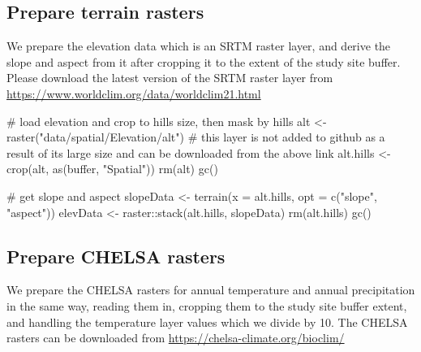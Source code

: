 \documentclass[]{article}
\newenvironment{Shaded}{}{}
\newcommand{\CommentTok}[1]{\textcolor[rgb]{0.00,0.50,0.00}{#1}}
\newcommand{\DataTypeTok}[1]{#1}
\newcommand{\KeywordTok}[1]{\textcolor[rgb]{0.00,0.00,1.00}{#1}}
\newcommand{\NormalTok}[1]{#1}
\newcommand{\OperatorTok}[1]{#1}
\newcommand{\StringTok}[1]{\textcolor[rgb]{0.00,0.50,0.50}{#1}}
\begin{document}
\hypertarget{prepare-terrain-rasters}{%
\subsection{Prepare terrain rasters}\label{prepare-terrain-rasters}}

We prepare the elevation data which is an SRTM raster layer, and derive the slope and aspect from it after cropping it to the extent of the study site buffer. Please download the latest version of the SRTM raster layer from \url{https://www.worldclim.org/data/worldclim21.html}

\begin{Shaded}
\begin{Highlighting}[numbers=left,,]
\CommentTok{# load elevation and crop to hills size, then mask by hills}
\NormalTok{alt <-}\StringTok{ }\KeywordTok{raster}\NormalTok{(}\StringTok{"data/spatial/Elevation/alt"}\NormalTok{) }\CommentTok{# this layer is not added to github as a result of its large size and can be downloaded from the above link}
\NormalTok{alt.hills <-}\StringTok{ }\KeywordTok{crop}\NormalTok{(alt, }\KeywordTok{as}\NormalTok{(buffer, }\StringTok{"Spatial"}\NormalTok{))}
\KeywordTok{rm}\NormalTok{(alt)}
\KeywordTok{gc}\NormalTok{()}

\CommentTok{# get slope and aspect}
\NormalTok{slopeData <-}\StringTok{ }\KeywordTok{terrain}\NormalTok{(}\DataTypeTok{x =}\NormalTok{ alt.hills, }\DataTypeTok{opt =} \KeywordTok{c}\NormalTok{(}\StringTok{"slope"}\NormalTok{, }\StringTok{"aspect"}\NormalTok{))}
\NormalTok{elevData <-}\StringTok{ }\NormalTok{raster}\OperatorTok{::}\KeywordTok{stack}\NormalTok{(alt.hills, slopeData)}
\KeywordTok{rm}\NormalTok{(alt.hills)}
\KeywordTok{gc}\NormalTok{()}
\end{Highlighting}
\end{Shaded}

\hypertarget{prepare-chelsa-rasters}{%
\subsection{Prepare CHELSA rasters}\label{prepare-chelsa-rasters}}

We prepare the CHELSA rasters for annual temperature and annual precipitation in the same way, reading them in, cropping them to the study site buffer extent, and handling the temperature layer values which we divide by 10. The CHELSA rasters can be downloaded from \url{https://chelsa-climate.org/bioclim/}
\end{document}
